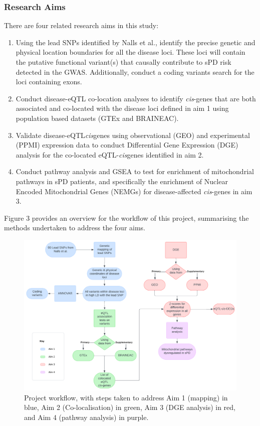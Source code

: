 \documentclass{article}
\begin{document}
\subsubsection{Research Aims}
\label{subsubsec:Aims}
There are four related research aims in this study:
\begin{enumerate}
    \item Using the lead SNPs identified by Nalls et al.\cite{Nalls2019IdentificationStudies}, identify the precise genetic and physical location boundaries for all the disease loci. These loci will contain the putative functional variant(s) that causally contribute to sPD risk detected in the GWAS. Additionally, conduct a coding variants search for the loci containing exons.
    \item Conduct disease-eQTL co-location analyses to identify \textit{cis}-genes that are both associated and co-located with the disease loci defined in aim 1 using population based datasets (GTEx and BRAINEAC).
    \item Validate disease-eQTL\textit{cis}genes using observational (GEO) and experimental (PPMI) expression data to conduct Differential Gene Expression (DGE) analysis for the co-located eQTL-\textit{cis}genes identified in aim 2.
    \item Conduct pathway analysis and GSEA\cite{Subramanian2005GeneProfiles} to test for enrichment of mitochondrial pathways in sPD patients, and specifically the enrichment of Nuclear Encoded Mitochondrial Genes (NEMGs) for disease-affected \textit{cis}-genes in aim 3.
\end{enumerate}
Figure 3 provides an overview for the workflow of this project, summarising the methods undertaken to address the four aims.
\newpage
\begin{figure}[!h]
    \centering
    \includegraphics[width=1\linewidth]{Thesis/thesis images/MSc Flowchart.png}
    \caption{Project workflow, with steps taken to address Aim 1 (mapping) in blue, Aim 2 (Co-localisation) in green, Aim 3 (DGE analysis) in red, and Aim 4 (pathway analysis) in purple.}
    \label{fig:enter-label}
\end{figure}
\end{document}
